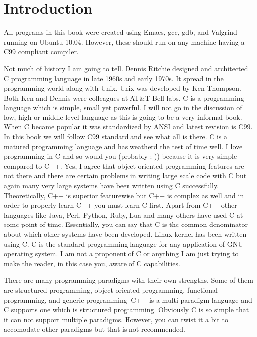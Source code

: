 \chapter{Introduction}
\startcolumns[n=3,distance=2em]
  \placelist
    [section]
    [alternative=c, %
     interaction=all,]
\stopcolumns
All programs in this book were created using Emacs, gcc, gdb, and
Valgrind  running on Ubuntu 10.04. However, these
should run on any machine having a C99 compliant compiler.

Not much of history I am going to tell. Dennis Ritchie designed and architected
C programming language in late 1960s and early 1970s. It spread in the
programming world along with Unix. Unix was developed by Ken Thompson. Both Ken
and Dennis were colleagues at AT\&T Bell labs. C is a programming language which
is simple, small yet powerful. I will not go in the discussion of low, high or
middle level language as this is going to be a very informal book. When C
became popular it was standardized by ANSI and latest revision is C99. In this
book we will follow C99 standard and see what all is there. C is a matured
programming language and has weatherd the test of time well. I love programming
in C and so would you (probably :-)) because it is very simple compared to C++.
Yes, I agree that object-oriented programming features are not there and there
are certain problems in writing large scale code with C but again many very
large systems have been written using C successfully.
Theoretically, C++ is superior featurewise but C++ is complex as well and in
order to properly learn C++ you must learn C first. Apart from C++ other
languages like Java, Perl, Python, Ruby, Lua and many others have used C at some
point of time. Essentially, you can say that C is the common denominator about
which other systems have been developed. Linux kernel has been written using C.
C is the standard programming language for any application of GNU operating
system. I am not a proponent of C or anything I am just trying to make the
reader, in this case you, aware of C capabilities.

There are many programming paradigms with their own strengths. Some of them are
structured programming, object-oriented programming, functional programming,
and generic programming. C++ is a multi-paradigm language and C supports one
which is structured programming. Obviously C is so simple that it can not
support multiple paradigms. However, you can twist it a bit to accomodate other
paradigms but that is not recommended.

